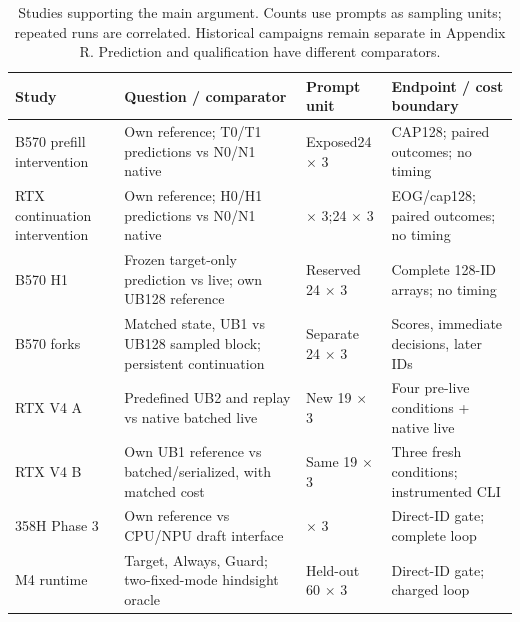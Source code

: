 \begin{table}[t]
\caption{Studies supporting the main argument. Counts use prompts as sampling units; repeated runs are correlated. Historical campaigns remain separate in Appendix R. Prediction and qualification have different comparators.}
\label{tab:studymap}
\centering
\begin{tabular}{@{}>{\raggedright\arraybackslash}p{1.12in}>{\raggedright\arraybackslash}p{2.20in}>{\raggedright\arraybackslash}p{1.03in}>{\raggedright\arraybackslash}p{1.65in}@{}}
\toprule
Study & Question / comparator & Prompt unit & Endpoint / cost boundary \\
\midrule
B570 prefill intervention & Own reference; T0/T1 predictions vs N0/N1 native & Exposed24 $\times$ 3 & CAP128; paired outcomes; no timing \\
RTX continuation intervention & Own reference; H0/H1 predictions vs N0/N1 native & 19 $\times$ 3;24 $\times$ 3 & EOG/cap128; paired outcomes; no timing \\
B570 H1 & Frozen target-only prediction vs live; own UB128 reference & Reserved 24 $\times$ 3 & Complete 128-ID arrays; no timing \\
B570 forks & Matched state, UB1 vs UB128 sampled block; persistent continuation & Separate 24 $\times$ 3 & Scores, immediate decisions, later IDs \\
RTX V4 A & Predefined UB2 and replay vs native batched live & New 19 $\times$ 3 & Four pre-live conditions + native live \\
RTX V4 B & Own UB1 reference vs batched/serialized, with matched cost & Same 19 $\times$ 3 & Three fresh conditions; instrumented CLI \\
358H Phase 3 & Own reference vs CPU/NPU draft interface & 30 $\times$ 3 & Direct-ID gate; complete loop \\
M4 runtime & Target, Always, Guard; two-fixed-mode hindsight oracle & Held-out 60 $\times$ 3 & Direct-ID gate; charged loop \\
\bottomrule
\end{tabular}
\end{table}
